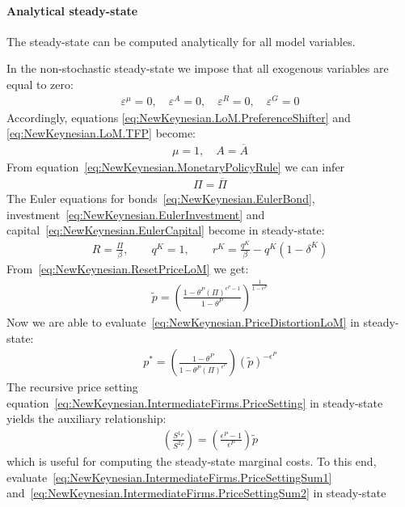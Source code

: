 \paragraph{Analytical steady-state} The steady-state can be computed analytically for all model variables.

In the non-stochastic steady-state we impose that all exogenous variables are equal to zero:
\begin{align*}
\varepsilon^{\mu}=0
,\quad
\varepsilon^{A}=0
,\quad
\varepsilon^{R}=0
,\quad
\varepsilon^{G}=0
\end{align*}
Accordingly, equations {\eqref{eq:NewKeynesian.LoM.PreferenceShifter}}
and {\eqref{eq:NewKeynesian.LoM.TFP}} become:
\begin{align*}
\mu = 1
,\quad
A = \overline{A}
\end{align*}
From equation~\eqref{eq:NewKeynesian.MonetaryPolicyRule} we can infer
\begin{align*}
\Pi = \overline{\Pi}
\end{align*}
The Euler equations for bonds~\eqref{eq:NewKeynesian.EulerBond},
  investment~\eqref{eq:NewKeynesian.EulerInvestment}
  and capital~\eqref{eq:NewKeynesian.EulerCapital} become in steady-state:
\begin{align*}
R = \frac{\Pi}{\beta}
,\qquad
q^{K} = 1
,\qquad
r^{K} = \frac{q^{K}}{\beta} - q^{K}(1-\delta^{K})
\end{align*}
From~\eqref{eq:NewKeynesian.ResetPriceLoM} we get:
\begin{align*}
\widetilde{p} = {\left(\frac{1 - \theta^{P} {(\Pi)}^{\epsilon^{P}-1}}{1 - \theta^{P}}\right)}^{\frac{1}{1-\epsilon^{P}}}
\end{align*}
Now we are able to evaluate~\eqref{eq:NewKeynesian.PriceDistortionLoM} in steady-state:
\begin{align*}
p^{*} = \left(\frac{1 - \theta^{P}}{1 - \theta^{P} {(\Pi)}^{\epsilon^{P}}}\right) {(\widetilde{p})}^{-\epsilon^{P}}
\end{align*}
The recursive price setting equation~\eqref{eq:NewKeynesian.IntermediateFirms.PriceSetting} in steady-state yields the auxiliary relationship:
\begin{align*}
\left(\frac{S^{1_{P}}}{S^{2_P}}\right) = \left(\frac{\epsilon^{P}-1}{\epsilon^{P}}\right) \widetilde{p}
\end{align*}
which is useful for computing the steady-state marginal costs.
To this end, evaluate~\eqref{eq:NewKeynesian.IntermediateFirms.PriceSettingSum1}
  and~\eqref{eq:NewKeynesian.IntermediateFirms.PriceSettingSum2} in steady-state
